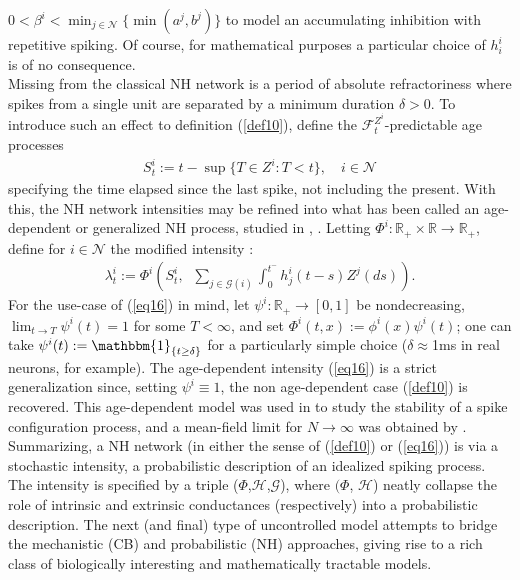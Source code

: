 \documentclass[12pt, oneside]{report}
\newcommand{\mbb}[1]{\mathbb{#1}}
\newcommand{\1}[1]{\mathbbm{1}_{\{#1\}}}
\newcommand{\mc}[1]{\mathcal{#1}}
\theoremstyle{definition}
\begin{document}
$0<\beta^i<\min_{j\in\mc{N}}\{\min(a^j,b^j)\}$ to model an accumulating
inhibition with repetitive spiking. Of course, for mathematical purposes a
particular choice of $h^i_i$ is of no consequence. \\[5pt]
\indent Missing from the classical NH network is a period of absolute
refractoriness where spikes from a single unit are separated by a minimum
duration $\delta>0$. To introduce such an effect to definition (\ref{def10}),
define the $\mc{F}^{Z^i}_t$-predictable age processes 
\begin{align}
    S^i_t:=t-\sup\{T\in Z^i: T<t\},\quad i\in\mc{N}
\end{align}
specifying the time elapsed since the last spike, not including the present.
With this, the NH network intensities may be refined into what has been
called an age-dependent or generalized NH process, studied in \cite{Chevallier_2017}, \cite{Chevallier_Caceres_Doumic_Reynaud_Bouret_2015}. Letting
$\Phi^i:\mbb{R}_+\times\mbb{R}\rightarrow\mbb{R}_+$, define for $i\in\mc{N}$ the
modified intensity \cite{Chevallier_2017}:
\begin{align}
    \lambda^i_t:=\Phi^i\left(S^i_t,\;\;\sum_{j\in\mc{G}(i)}\int_0^{t^-}h^i_j(t-s)Z^j(ds)\right).\label{eq16}
\end{align} 
For the use-case of (\ref{eq16}) in mind, let $\psi^i:\mbb{R}_+\rightarrow
[0,1]$ be nondecreasing, $\lim_{t\rightarrow T}\psi^i(t)=1$ for some $T<\infty$,
and set $\Phi^i(t,x):=\phi^i(x)\psi^i(t)$; one can take
$\psi^i(t):=\1{t\geq\delta}$ for a particularly simple choice
($\delta\approx$1ms in real neurons, for example). The age-dependent intensity
(\ref{eq16}) is a strict generalization since, setting $\psi^i\equiv 1$, the non
age-dependent case (\ref{def10}) is recovered. This age-dependent model was used
in \cite{Borovkov_Decrouez_Gilson_2014} to study the stability of a spike
configuration process, and a mean-field limit for $N\rightarrow\infty$ was
obtained by \cite{Chevallier_2017}.\\[5pt]
\indent Summarizing, a NH network (in either the sense of (\ref{def10}) or
(\ref{eq16})) is via a stochastic intensity, a probabilistic description of an
idealized spiking process. The intensity is specified by a triple
($\Phi$,$\mc{H}$,$\mc{G}$), where $(\Phi$, $\mc{H}$) neatly collapse the role of
intrinsic and extrinsic conductances (respectively) into a probabilistic
description. The next (and final) type of uncontrolled model attempts to bridge
the mechanistic (CB) and probabilistic (NH) approaches, giving rise to a rich
class of biologically interesting and mathematically tractable models.
\end{document}
